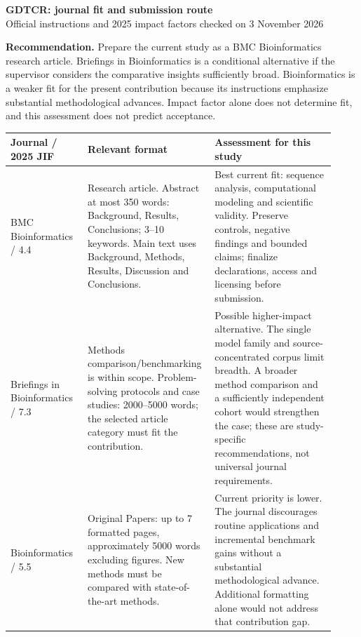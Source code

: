 \documentclass[a4paper,10pt]{article}
\begin{document}
\begin{center}
{\Large\bfseries GDTCR: journal fit and submission route}\\[4pt]
Official instructions and 2025 impact factors checked on 3 November 2026
\end{center}

\textbf{Recommendation.}
Prepare the current study as a BMC Bioinformatics research article.
Briefings in Bioinformatics is a conditional alternative if the supervisor
considers the comparative insights sufficiently broad. Bioinformatics is a
weaker fit for the present contribution because its instructions emphasize
substantial methodological advances. Impact factor alone does not determine
fit, and this assessment does not predict acceptance.

\small
\begin{tabular}{>{\raggedright\arraybackslash}p{0.23\linewidth}
                >{\raggedright\arraybackslash}p{0.33\linewidth}
                >{\raggedright\arraybackslash}p{0.36\linewidth}}
\toprule
Journal / 2025 JIF & Relevant format & Assessment for this study\\
\midrule
BMC Bioinformatics / 4.4 &
Research article. Abstract at most 350 words: Background, Results,
Conclusions; 3--10 keywords. Main text uses Background, Methods, Results,
Discussion and Conclusions. &
Best current fit: sequence analysis, computational modeling and
scientific validity. Preserve controls, negative findings and bounded
claims; finalize declarations, access and licensing before submission.\\[7pt]
Briefings in Bioinformatics / 7.3 &
Methods comparison/benchmarking is within scope. Problem-solving protocols
and case studies: 2000--5000 words; the selected article category must fit
the contribution. &
Possible higher-impact alternative. The single model family and
source-concentrated corpus limit breadth. A broader method comparison and
a sufficiently independent cohort would strengthen the case; these are
study-specific recommendations, not universal journal requirements.\\[7pt]
Bioinformatics / 5.5 &
Original Papers: up to 7 formatted pages, approximately 5000 words excluding
figures. New methods must be compared with state-of-the-art methods. &
Current priority is lower. The journal discourages routine applications and
incremental benchmark gains without a substantial methodological advance.
Additional formatting alone would not address that contribution gap.\\
\bottomrule
\end{tabular}
\normalsize
\end{document}

